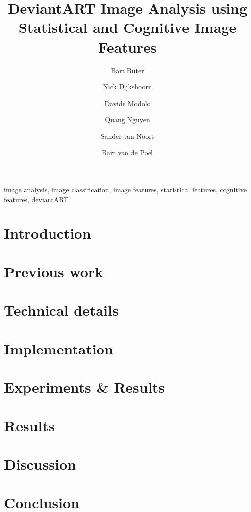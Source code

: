 \documentclass[%
        final,
        notitlepage,
        narroweqnarray,
        inline,
        ]{ieee}
\begin{document}
\title[DeviantART Image Analysis]{%
       DeviantART Image Analysis using Statistical and Cognitive Image Features}
\author{Bart Buter  \and Nick Dijkshoorn \and Davide Modolo  \and Quang Nguyen \and Sander van Noort \and Bart van de Poel}


\maketitle


\begin{abstract}

\end{abstract}


\begin{keywords}
image analysis, image classification, image features, statistical features, cognitive features, deviantART
\end{keywords}


\section{Introduction}



\section{Previous work}



\section{Technical details}



\section{Implementation}



\section{Experiments \& Results}



\section{Results}



\section{Discussion}



\section{Conclusion}


\nocite{*}


\end{document}
